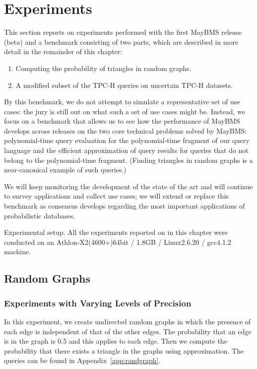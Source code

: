 

\chapter{Experiments}



This section reports on experiments performed with the first MayBMS release
(beta) and a benchmark consisting of two parts,
which are described in more detail in the remainder of this chapter:
%
\begin{enumerate}
\item
Computing the probability of triangles in random graphs.

\item
A modified subset of the TPC-H queries on uncertain TPC-H datasets.
\end{enumerate}


By this benchmark, we do not attempt to simulate a representative set of
use cases: the jury is still out on what such a set of use cases might be.
Instead, we focus on a benchmark that allows us to see how the performance
of MayBMS develops across releases on the two core technical problems solved
by MayBMS: polynomial-time query evaluation for the polynomial-time fragment
of our query language and the efficient approximation of query results for
queries that do not belong to the polynomial-time fragment. (Finding triangles
in random graphs is a near-canonical example of such queries.)

We will keep monitoring the development of the state of the art and will
continue to survey applications and collect use cases; we will extend or
replace this benchmark as consensus develops regarding the most important
applications of probabilistic databases.


\medskip

Experimental setup.
All the experiments reported on in this chapter were conducted on an Athlon-X2(4600+)64bit / 1.8GB / Linux2.6.20 / gcc4.1.2 machine.



\section{Random Graphs}
\subsection{Experiments with Varying Levels of Precision} 

In this experiment, we create undirected random graphs in which 
the presence of each edge is independent of that of the other edges. The probability that an edge is in the graph is 0.5 and
this applies to each edge. Then we compute the probability that there exists a triangle in the graphs using approximation.
The queries can be found in Appendix~\ref{app:randgraph}.

